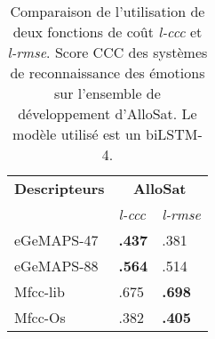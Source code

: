 \begin{table}[htp]
\centering
\begin{tabular}{| l | l l |}
    \hline
    \textbf{Descripteurs} &\multicolumn{2}{c|}{\textbf{AlloSat}} \\
      &\textit{l-ccc}   &\textit{l-rmse}  \\
    \hline
    eGeMAPS-47  &\textbf{.437} &.381       \\
    eGeMAPS-88  &\textbf{.564} &.514       \\
    Mfcc-lib    &.675  &\textbf{.698} \\
    Mfcc-Os     &.382   &\textbf{.405}      \\
    \hline
\end{tabular}
\caption{Comparaison de l'utilisation de deux fonctions de coût \textit{l-ccc} et \textit{l-rmse}. Score CCC des systèmes de reconnaissance des émotions sur l'ensemble de développement d'AlloSat. Le modèle utilisé est un biLSTM-4.}
\label{tab:cccVSrmse}
\end{table}

